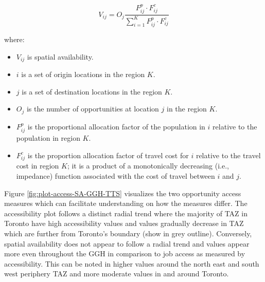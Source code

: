 \documentclass[Royal,times,sageh]{sagej}
\providecommand{\tightlist}{%
  \setlength{\itemsep}{0pt}\setlength{\parskip}{0pt}}
\begin{document}
\begin{equation}
\label{eq:spatial-availability}
V_{ij} = O_j\frac{F^p_{ij} \cdot F^c_{ij}}{\sum_{i=1}^K F^p_{ij} \cdot F^c_{ij}}
\end{equation}

\noindent where:

\begin{itemize}
\tightlist
\item
  \(V_{ij}\) is spatial availability.
\item
  \(i\) is a set of origin locations in the region \(K\).
\item
  \(j\) is a set of destination locations in the region \(K\).
\item
  \(O_j\) is the number of opportunities at location \(j\) in the region
  \(K\).
\item
  \(F^p_{ij}\) is the proportional allocation factor of the population
  in \(i\) relative to the population in region \(K\).
\item
  \(F^c_{ij}\) is the proportion allocation factor of travel cost for
  \(i\) relative to the travel cost in region \(K\); it is a product of
  a monotonically decreasing (i.e., impedance) function associated with
  the cost of travel between \(i\) and \(j\).
\end{itemize}

Figure \ref{fig:plot-access-SA-GGH-TTS} visualizes the two opportunity
access measures which can facilitate understanding on how the measures
differ. The accessibility plot follows a distinct radial trend where the
majority of TAZ in Toronto have high accessibility values and values
gradually decrease in TAZ which are further from Toronto's boundary
(show in grey outline). Conversely, spatial availability does not appear
to follow a radial trend and values appear more even throughout the GGH
in comparison to job access as measured by accessibility. This can be
noted in higher values around the north east and south west periphery
TAZ and more moderate values in and around Toronto.
\end{document}
